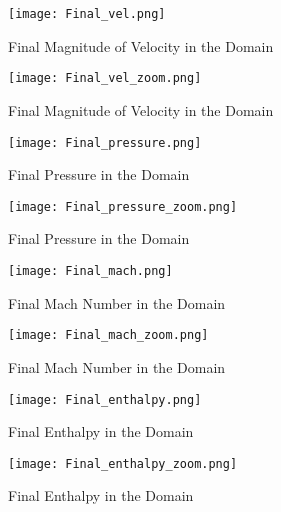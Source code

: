 \documentclass[a4paper,12pt,titlepage]{article}
\newcommand{\scale}{0.5}
\begin{document}
\begin{figure}[H]
  \begin{center}
    \texttt{[image: Final\_vel.png]}
    \caption{Final Magnitude of Velocity in the Domain}
  \end{center}
\end{figure}
  
\begin{figure}[H]
  \begin{center}
    \texttt{[image: Final\_vel\_zoom.png]}
    \caption{Final Magnitude of Velocity in the Domain}
  \end{center}
\end{figure}

\begin{figure}[H]
  \begin{center}
    \texttt{[image: Final\_pressure.png]}
    \caption{Final Pressure in the Domain}
  \end{center}
\end{figure}

\begin{figure}[H]
  \begin{center}
    \texttt{[image: Final\_pressure\_zoom.png]}
    \caption{Final Pressure in the Domain}
  \end{center}
\end{figure}

\begin{figure}[H]
  \begin{center}
    \texttt{[image: Final\_mach.png]}
    \caption{Final Mach Number in the Domain}
  \end{center}
\end{figure}

\begin{figure}[H]
  \begin{center}
    \texttt{[image: Final\_mach\_zoom.png]}
    \caption{Final Mach Number in the Domain}
  \end{center}
\end{figure}

\begin{figure}[H]
  \begin{center}
    \texttt{[image: Final\_enthalpy.png]}
    \caption{Final Enthalpy in the Domain}
  \end{center}
\end{figure}

\begin{figure}[H]
  \begin{center}
    \texttt{[image: Final\_enthalpy\_zoom.png]}
    \caption{Final Enthalpy in the Domain}
  \end{center}
\end{figure}
\end{document}

